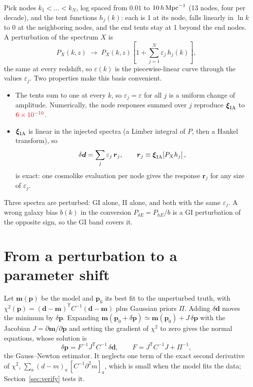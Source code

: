 \documentclass[11pt]{article}
\newcommand{\hMpc}{\,h\,{\rm Mpc}^{-1}}
\newcommand{\PdE}{P_{\delta E}}
\newcommand{\T}{^{\mathsf{T}}}
\newcommand{\bvec}[1]{\boldsymbol{#1}}
\newif\ifnumbersfinal
\newcommand{\refresh}[1]{\ifnumbersfinal#1\else\textcolor{red}{#1}\fi}
\newcommand{\PartitionCheck}{\refresh{6\times10^{-10}}}
\newcommand{\Nnodes}{13}
\begin{document}
Pick nodes $k_1 < \dots < k_N$, log spaced from $0.01$ to $10\hMpc$
(\Nnodes{} nodes, four per decade), and the tent functions $h_j(k)$: each
is 1 at its node, falls linearly in $\ln k$ to 0 at the neighboring nodes,
and the end tents stay at 1 beyond the end nodes. A perturbation of the
spectrum $X$ is
\begin{equation}
  P_X(k, z) \;\to\; P_X(k, z)\left[1 + \sum_{j=1}^{N} \varepsilon_j\, h_j(k)\right],
  \label{eq:pert}
\end{equation}
the same at every redshift, so $\varepsilon(k)$ is the piecewise-linear
curve through the values $\varepsilon_j$. Two properties make this basis
convenient.
\begin{itemize}
  \item The tents sum to one at every $k$, so $\varepsilon_j = \varepsilon$
    for all $j$ is a uniform change of amplitude. Numerically, the node
    responses summed over $j$ reproduce $\bvec\xi_{\rm IA}$ to
    $\PartitionCheck$.
  \item $\bvec\xi_{\rm IA}$ is linear in the injected spectra (a Limber
    integral of $P$, then a Hankel transform), so
    \begin{equation}
      \delta\bvec d = \sum_j \varepsilon_j\, \bvec r_j,
      \qquad \bvec r_j \equiv \bvec\xi_{\rm IA}\!\left[P_X h_j\right],
    \end{equation}
    is exact: one cosmolike evaluation per node gives the response $\bvec
    r_j$ for any size of $\varepsilon_j$.
\end{itemize}
Three spectra are perturbed: GI alone, II alone, and both with the same
$\varepsilon_j$. A wrong galaxy bias $b(k)$ in the conversion $\PdE = P_{hE}/b$
is a GI perturbation of the opposite sign, so the GI band covers it.

\section{From a perturbation to a parameter shift}
\label{sec:response}

Let $\bvec m(\bvec p)$ be the model and $\bvec p_0$ its best fit to the
unperturbed truth, with $\chi^2(\bvec p) = (\bvec d - \bvec m)\T C^{-1}
(\bvec d - \bvec m)$ plus Gaussian priors $\Pi$. Adding $\delta\bvec d$ moves
the minimum by $\delta\bvec p$. Expanding $\bvec m(\bvec p_0 + \delta\bvec
p) \simeq \bvec m(\bvec p_0) + J\,\delta\bvec p$ with the Jacobian $J =
\partial\bvec m/\partial\bvec p$ and setting the gradient of $\chi^2$ to zero
gives the normal equations, whose solution is
\begin{equation}
  \delta\bvec p = F^{-1} J\T C^{-1}\,\delta\bvec d,
  \qquad F = J\T C^{-1} J + \Pi^{-1},
  \label{eq:response}
\end{equation}
the Gauss--Newton estimator. It neglects one term of the exact
second derivative of $\chi^2$, $\sum_a (d - m)_a\, [C^{-1}\partial^2 m]_a$,
which is small when the model fits the data; Section~\ref{sec:verify}
tests it.
\end{document}
